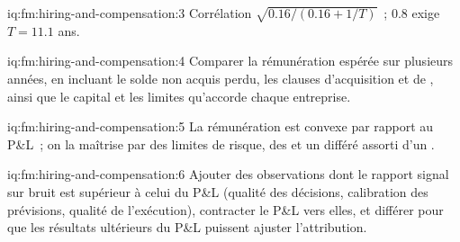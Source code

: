 \begin{solution}{iq:fm:hiring-and-compensation:3}
Corrélation $\sqrt{0.16/(0.16+1/T)}$~; 0.8 exige $T=11.1$ ans.
\end{solution}

\begin{solution}{iq:fm:hiring-and-compensation:4}
Comparer la rémunération espérée sur plusieurs années, en incluant le solde non acquis perdu, les clauses d'acquisition et de , ainsi que le capital et les limites qu'accorde chaque
entreprise.
\end{solution}

\begin{solution}{iq:fm:hiring-and-compensation:5}
La rémunération est convexe par rapport au P\&L~; on la maîtrise par des limites de risque, des  et un différé assorti d'un .
\end{solution}

\begin{solution}{iq:fm:hiring-and-compensation:6}
Ajouter des observations dont le rapport signal sur bruit est supérieur à celui du P\&L (qualité des décisions, calibration des prévisions, qualité de l'exécution), contracter le P\&L vers
elles, et différer pour que les résultats ultérieurs du P\&L puissent ajuster l'attribution.
\end{solution}

